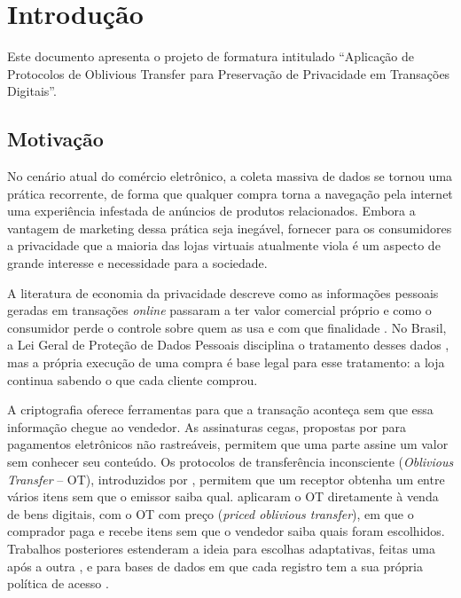 \chapter{Introdução}\label{cap:introducao}

Este documento apresenta o projeto de formatura intitulado ``Aplicação de
Protocolos de Oblivious Transfer para Preservação de Privacidade em Transações
Digitais''.

\section{Motivação}

No cenário atual do comércio eletrônico, a coleta massiva de dados se tornou
uma prática recorrente, de forma que qualquer compra torna a navegação pela
internet uma experiência infestada de anúncios de produtos relacionados.
Embora a vantagem de marketing dessa prática seja inegável, fornecer para os
consumidores a privacidade que a maioria das lojas virtuais atualmente viola é
um aspecto de grande interesse e necessidade para a sociedade.

A literatura de economia da privacidade descreve como as informações pessoais
geradas em transações \emph{online} passaram a ter valor comercial próprio e
como o consumidor perde o controle sobre quem as usa e com que finalidade
\cite{acquisti2016}. No Brasil, a Lei Geral de Proteção de Dados Pessoais
disciplina o tratamento desses dados \cite{lgpd2018}, mas a própria execução de
uma compra é base legal para esse tratamento: a loja continua sabendo o que
cada cliente comprou.

A criptografia oferece ferramentas para que a transação aconteça sem que essa
informação chegue ao vendedor. As assinaturas cegas, propostas por
 para pagamentos eletrônicos não rastreáveis, permitem
que uma parte assine um valor sem conhecer seu conteúdo. Os protocolos de
transferência inconsciente (\emph{Oblivious Transfer} -- OT), introduzidos por
, permitem que um receptor obtenha um entre vários itens
sem que o emissor saiba qual.  aplicaram o OT
diretamente à venda de bens digitais, com o OT com preço (\emph{priced
oblivious transfer}), em que o comprador paga e recebe itens sem que o
vendedor saiba quais foram escolhidos. Trabalhos posteriores estenderam a
ideia para escolhas adaptativas, feitas uma após a outra \cite{camenisch2007},
e para bases de dados em que cada registro tem a sua própria política de
acesso \cite{camenisch2009}.

